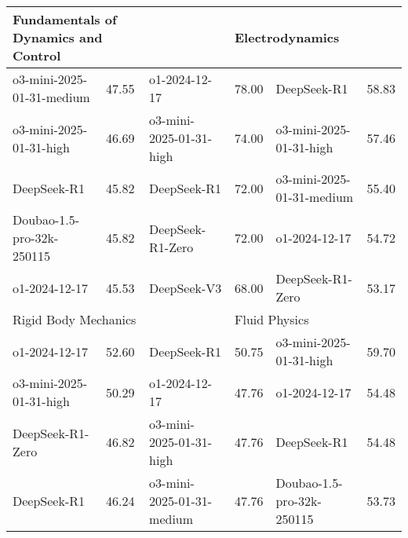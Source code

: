 {\begin{longtable}{p{4.2cm}>{\centering\arraybackslash} p{0.8cm}|p{4.2cm} >{\centering\arraybackslash} p{0.8cm}|p{4.2cm} >{\centering\arraybackslash} p{0.8cm}}
\hline
\multicolumn{2}{p{5.15cm}|}{\cellcolor{blue!10} \centering Fundamentals of Dynamics and Control} & \multicolumn{2}{p{5.15cm}|}{\cellcolor{yellow!10} \centering Geriatric Medicine} & \multicolumn{2}{p{5.15cm}}{\cellcolor{green!10} \centering Electrodynamics}\\
\hline
\cellcolor{blue!5} o3-mini-2025-01-31-medium & \cellcolor{blue!2}47.55 & \cellcolor{yellow!5} o1-2024-12-17 & \cellcolor{yellow!2} 78.00 & \cellcolor{green!5} DeepSeek-R1 & \cellcolor{green!2} 58.83\\
\cellcolor{blue!5} o3-mini-2025-01-31-high & \cellcolor{blue!2}46.69 & \cellcolor{yellow!5} o3-mini-2025-01-31-high & \cellcolor{yellow!2} 74.00 & \cellcolor{green!5} o3-mini-2025-01-31-high & \cellcolor{green!2} 57.46\\
\cellcolor{blue!5} DeepSeek-R1 & \cellcolor{blue!2}45.82 & \cellcolor{yellow!5} DeepSeek-R1 & \cellcolor{yellow!2} 72.00 & \cellcolor{green!5} o3-mini-2025-01-31-medium & \cellcolor{green!2} 55.40\\
\cellcolor{blue!5} Doubao-1.5-pro-32k-250115 & \cellcolor{blue!2}45.82 & \cellcolor{yellow!5} DeepSeek-R1-Zero & \cellcolor{yellow!2} 72.00 & \cellcolor{green!5} o1-2024-12-17 & \cellcolor{green!2} 54.72\\
\cellcolor{blue!5} o1-2024-12-17 & \cellcolor{blue!2}45.53 & \cellcolor{yellow!5} DeepSeek-V3 & \cellcolor{yellow!2} 68.00 & \cellcolor{green!5} DeepSeek-R1-Zero & \cellcolor{green!2} 53.17\\
\hline
\multicolumn{2}{p{5.15cm}|}{\cellcolor{blue!10} \centering Rigid Body Mechanics} & \multicolumn{2}{p{5.15cm}|}{\cellcolor{yellow!10} \centering Imaging and Nuclear Medicine} & \multicolumn{2}{p{5.15cm}}{\cellcolor{green!10} \centering Fluid Physics}\\
\hline
\cellcolor{blue!5} o1-2024-12-17 & \cellcolor{blue!2}52.60 & \cellcolor{yellow!5} DeepSeek-R1 & \cellcolor{yellow!2} 50.75 & \cellcolor{green!5} o3-mini-2025-01-31-high & \cellcolor{green!2} 59.70\\
\cellcolor{blue!5} o3-mini-2025-01-31-high & \cellcolor{blue!2}50.29 & \cellcolor{yellow!5} o1-2024-12-17 & \cellcolor{yellow!2} 47.76 & \cellcolor{green!5} o1-2024-12-17 & \cellcolor{green!2} 54.48\\
\cellcolor{blue!5} DeepSeek-R1-Zero & \cellcolor{blue!2}46.82 & \cellcolor{yellow!5} o3-mini-2025-01-31-high & \cellcolor{yellow!2} 47.76 & \cellcolor{green!5} DeepSeek-R1 & \cellcolor{green!2} 54.48\\
\cellcolor{blue!5} DeepSeek-R1 & \cellcolor{blue!2}46.24 & \cellcolor{yellow!5} o3-mini-2025-01-31-medium & \cellcolor{yellow!2} 47.76 & \cellcolor{green!5} Doubao-1.5-pro-32k-250115 & \cellcolor{green!2} 53.73\\

\end{longtable}}
